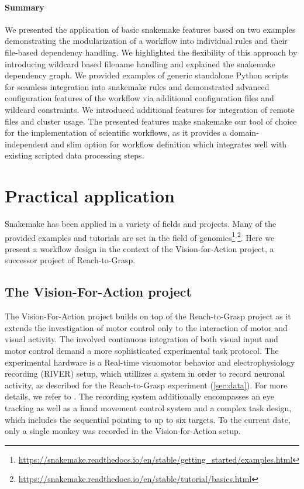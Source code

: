 \paragraph{Summary}
We presented the application of basic snakemake features based on two examples demonstrating the modularization of a workflow into individual rules and their file-based dependency handling. We highlighted the flexibility of this approach by introducing wildcard based filename handling and explained the snakemake dependency graph. We provided examples of generic standalone Python scripts for seamless integration into snakemake rules and demonstrated advanced configuration features of the workflow via additional configuration files and wildcard constraints. We introduced additional features for integration of remote files and cluster usage.
The presented features make snakemake our tool of choice for the implementation of scientific workflows, as it provides a domain-independent and slim option for workflow definition which integrates well with existing scripted data processing steps.


\section{Practical application}
Snakemake has been applied in a variety of fields and projects. Many of the provided examples and tutorials are set in the field of genomics\footnote{\url{https://snakemake.readthedocs.io/en/stable/getting_started/examples.html}}$^,$\footnote{\url{https://snakemake.readthedocs.io/en/stable/tutorial/basics.html}}. Here we present a workflow design in the context of the Vision-for-Action project, a successor project of Reach-to-Grasp.

\subsection{The Vision-For-Action project}
The Vision-For-Action project builds on top of the Reach-to-Grasp project as it extends the investigation of motor control only to the interaction of motor and visual activity. The involved continuous integration of both visual input and motor control demand a more sophisticated experimental task protocol. The experimental hardware is a Real-time visuomotor behavior and electrophysiology recording (RIVER) setup, which utillizes a  system in order to record neuronal activity, as described for the Reach-to-Grasp experiment (\cref{sec:data}). For more details, we refer to \citet{deHaan_2018,deHaan_2018a}. The recording system additionally encompasses an eye tracking as well as a hand movement control system and a complex task design, which includes the sequential pointing to up to six targets. To the current date, only a single monkey was recorded in the Vision-for-Action setup.

